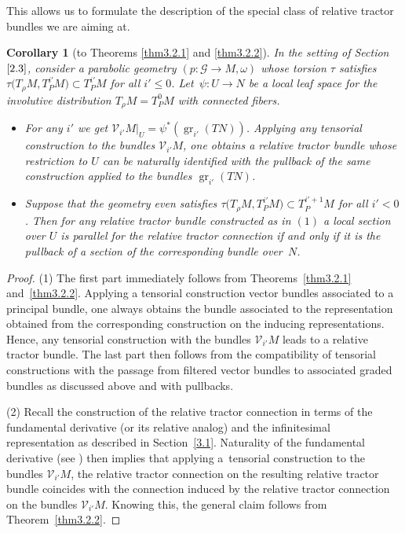 \documentclass[10pt,a4paper]{amsart}
\numberwithin{equation}{section}
\newtheorem{Corollary}[Theorem]{Corollary}
\def\Cal{\mathcal}
\newcommand{\om}{\omega}
\newcommand{\gr}{\operatorname{gr}}
\begin{document}
This allows us to formulate the description of the special class of relative tractor
bundles we are aiming at.
\begin{Corollary}[to Theorems \ref{thm3.2.1} and \ref{thm3.2.2}] \label{cor3.3}
In the setting of Section~$\ref{2.3}$, consider a parabolic geometry $(p\colon \Cal G\to M,\om)$
whose torsion $\tau$ satisfies $\tau\bigl(T_\rho M,T^{i'}_PM\bigr)\subset T^{i'}_PM$ for all
$i'\leq 0$. Let~${\psi\colon U\to N}$ be a local leaf space for the involutive distribution
$T_\rho M=T^0_PM$ with connected fibers.
\begin{itemize}\itemsep=0pt
\item[$(1)$] For any $i'$ we get $\Cal V_{i'}M|_U=\psi^*(\gr_{i'}(TN))$. Applying any
tensorial construction to the bundles $\Cal V_{i'}M$, one obtains a relative tractor
bundle whose restriction to $U$ can be naturally identified with the pullback of the
same construction applied to the bundles $\gr_{i'}(TN)$.
\item[$(2)$] Suppose that the geometry even satisfies $\tau\bigl(T_\rho M,T^{i'}_PM\bigr)\subset
T^{i'+1}_PM$ for all $i'<0$. Then for any relative
tractor bundle constructed as in $(1)$ a local section over $U$ is parallel for the
relative tractor connection if and only if it is the pullback of a section of the
corresponding bundle over~$N$.
\end{itemize}
\end{Corollary}
\begin{proof}
 (1) The first part immediately follows from Theorems~\ref{thm3.2.1} and~\ref{thm3.2.2}. Applying a tensorial construction vector bundles associated to a
 principal bundle, one always obtains the bundle associated to the representation
 obtained from the corresponding construction on the inducing representations. Hence, any tensorial construction with the bundles $\Cal V_{i'}M$ leads to a relative
 tractor bundle. The last part then follows from the compatibility of tensorial
 constructions with the passage from filtered vector bundles to associated graded
 bundles as discussed above and with pullbacks.

(2) Recall the construction of the relative tractor connection in terms of the
 fundamental derivative (or its relative analog) and the infinitesimal
 representation as described in Section~\ref{3.1}. Naturality of the fundamental
 derivative (see \cite[Section 1.5.8]{book}) then implies that applying
 a~tensorial construction to the bundles $\Cal V_{i'}M$, the relative tractor
 connection on the resulting relative tractor bundle coincides with the connection
 induced by the relative tractor connection on the bundles $\Cal V_{i'}M$. Knowing
 this, the general claim follows from Theorem~\ref{thm3.2.2}.
\end{proof}
\end{document}
